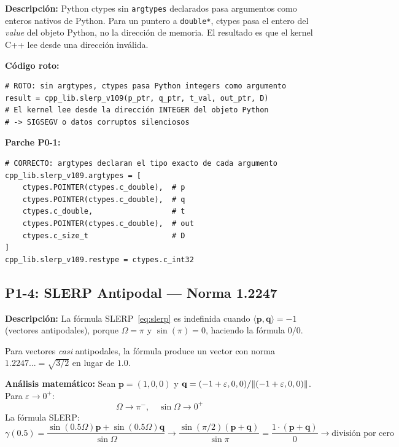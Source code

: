 \textbf{Descripción:} Python ctypes sin \texttt{argtypes} declarados pasa argumentos
como enteros nativos de Python. Para un puntero a \texttt{double*}, ctypes pasa
el entero del \textit{value} del objeto Python, no la dirección de memoria. El resultado
es que el kernel C++ lee desde una dirección inválida.

\textbf{Código roto:}
\begin{lstlisting}[style=pythonstyle, caption={P0-1: argtypes ausentes (ROTO)}, label=lst:p01_bug]
# ROTO: sin argtypes, ctypes pasa Python integers como argumento
result = cpp_lib.slerp_v109(p_ptr, q_ptr, t_val, out_ptr, D)
# El kernel lee desde la dirección INTEGER del objeto Python
# -> SIGSEGV o datos corruptos silenciosos
\end{lstlisting}

\textbf{Parche P0-1:}
\begin{lstlisting}[style=pythonstyle, caption={P0-1: argtypes completos (CORRECTO)}, label=lst:p01_fix]
# CORRECTO: argtypes declaran el tipo exacto de cada argumento
cpp_lib.slerp_v109.argtypes = [
    ctypes.POINTER(ctypes.c_double),  # p
    ctypes.POINTER(ctypes.c_double),  # q
    ctypes.c_double,                  # t
    ctypes.POINTER(ctypes.c_double),  # out
    ctypes.c_size_t                   # D
]
cpp_lib.slerp_v109.restype = ctypes.c_int32
\end{lstlisting}

\subsection{P1-4: SLERP Antipodal --- Norma 1.2247}

\textbf{Descripción:} La fórmula SLERP~\eqref{eq:slerp} es indefinida cuando
$\langle\mathbf{p}, \mathbf{q}\rangle = -1$ (vectores antipodales), porque
$\Omega = \pi$ y $\sin(\pi) = 0$, haciendo la fórmula $0/0$.

Para vectores \textit{casi} antipodales, la fórmula produce un vector con norma
$1.2247... = \sqrt{3/2}$ en lugar de $1.0$.

\textbf{Análisis matemático:}
Sean $\mathbf{p} = (1, 0, 0)$ y $\mathbf{q} = (-1+\varepsilon, 0, 0)/\norm{(-1+\varepsilon,0,0)}$.
Para $\varepsilon \to 0^+$:
\begin{equation}
\Omega \to \pi^-, \quad \sin\Omega \to 0^+
\end{equation}
La fórmula SLERP:
\begin{equation}
\gamma(0.5) = \frac{\sin(0.5\Omega)\mathbf{p} + \sin(0.5\Omega)\mathbf{q}}{\sin\Omega}
\to \frac{\sin(\pi/2)(\mathbf{p} + \mathbf{q})}{\sin\pi}
= \frac{1 \cdot (\mathbf{p} + \mathbf{q})}{0} \to \text{división por cero}
\end{equation}

